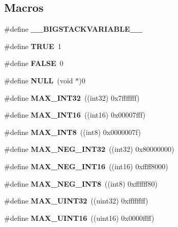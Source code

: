 \subsection*{Macros}
\begin{DoxyCompactItemize}
\item 
\#define {\bfseries \+\_\+\+\_\+\+B\+I\+G\+S\+T\+A\+C\+K\+V\+A\+R\+I\+A\+B\+L\+E\+\_\+\+\_\+}\label{prim__type_8h_a64d603953ff96570ac4072daaeaeb36b}

\item 
\#define {\bfseries T\+R\+U\+E}~1\label{prim__type_8h_aa8cecfc5c5c054d2875c03e77b7be15d}

\item 
\#define {\bfseries F\+A\+L\+S\+E}~0\label{prim__type_8h_aa93f0eb578d23995850d61f7d61c55c1}

\item 
\#define {\bfseries N\+U\+L\+L}~(void $\ast$)0\label{prim__type_8h_a070d2ce7b6bb7e5c05602aa8c308d0c4}

\item 
\#define {\bfseries M\+A\+X\+\_\+\+I\+N\+T32}~((int32) 0x7fffffff)\label{prim__type_8h_aac62d87844689a18b6f5339a89ed6e7f}

\item 
\#define {\bfseries M\+A\+X\+\_\+\+I\+N\+T16}~((int16) 0x00007fff)\label{prim__type_8h_a3905e54374e49708219791e7d59c60fb}

\item 
\#define {\bfseries M\+A\+X\+\_\+\+I\+N\+T8}~((int8)  0x0000007f)\label{prim__type_8h_aa092b7d509790c28edc065b23de6e39e}

\item 
\#define {\bfseries M\+A\+X\+\_\+\+N\+E\+G\+\_\+\+I\+N\+T32}~((int32) 0x80000000)\label{prim__type_8h_a29962133c3b9c5c2cf72f7d9299fd4a0}

\item 
\#define {\bfseries M\+A\+X\+\_\+\+N\+E\+G\+\_\+\+I\+N\+T16}~((int16) 0xffff8000)\label{prim__type_8h_a4338527c828e68762d8b40e01f0e0869}

\item 
\#define {\bfseries M\+A\+X\+\_\+\+N\+E\+G\+\_\+\+I\+N\+T8}~((int8)  0xffffff80)\label{prim__type_8h_a76a3e608c93aff0ad98b3b742c51d38f}

\item 
\#define {\bfseries M\+A\+X\+\_\+\+U\+I\+N\+T32}~((uint32) 0xffffffff)\label{prim__type_8h_a26248174abf27973b9edfa9b70ba4c93}

\item 
\#define {\bfseries M\+A\+X\+\_\+\+U\+I\+N\+T16}~((uint16) 0x0000ffff)\label{prim__type_8h_abc023544d8096a8fa1bd1f6f6f90bc41}


\end{DoxyCompactItemize}
